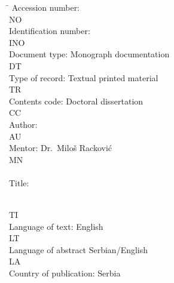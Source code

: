 \noindent
\begin{tabbing}
  \hspace*{.3\textwidth}   \= \hspace*{.7\textwidth}        \kill
  Accession number:        \>                               \\
  NO                       \>                               \\
  Identification number:   \>                               \\
  INO                      \>                               \\
  Document type:           \> Monograph documentation       \\
  DT                       \>                               \\
  Type of record:          \> Textual printed material      \\
  TR                       \>                               \\
  Contents code:           \> Doctoral dissertation             \\
  CC                       \>                               \\
  Author:                  \> \autor                  \\
  AU                       \>                               \\
  Mentor:                  \> Dr.~Miloš Racković          \\
  MN                       \>                               \\
                           \>                               \\
  Title:                   \>
    \begin{minipage}[t]{.7\textwidth}
      \naslov
    \end{minipage}                                          \\
    TI                       \>                               \\
    Language of text:        \> English                       \\
    LT                       \>                               \\
    Language of abstract     \> Serbian/English               \\
    LA                       \>                               \\
    Country of publication:  \> Serbia                        \\

\end{tabbing}
